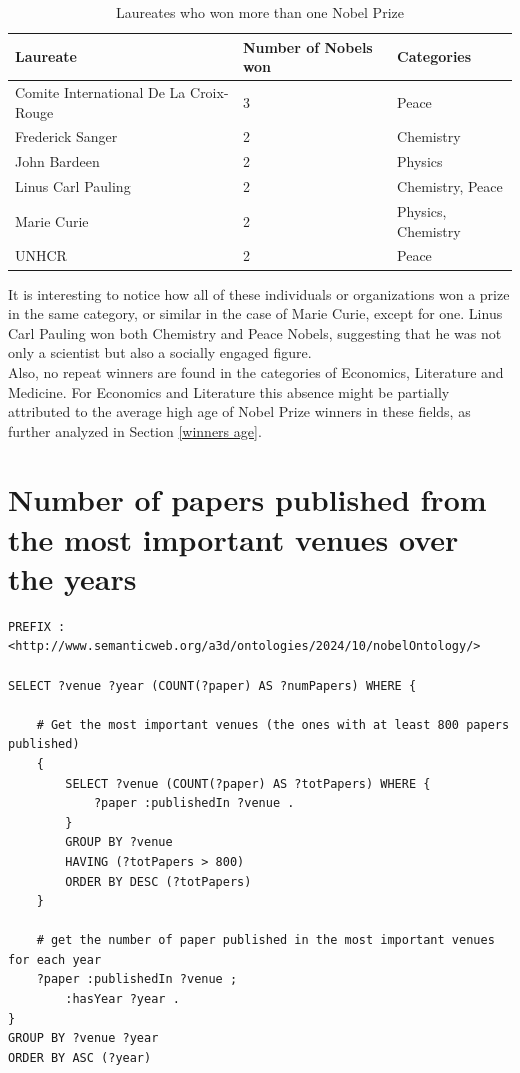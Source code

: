 \documentclass{article}
\begin{document}
\begin{table}[H]
	\caption{Laureates who won more than one Nobel Prize}
	\centering
	\begin{tabular}{|l|l|l|}
		\hline
		\textbf{Laureate}                      & \textbf{Number of Nobels won} & \textbf{Categories} \\ \hline
		Comite International De La Croix-Rouge & 3                             & Peace               \\ \hline
		Frederick Sanger                       & 2                             & Chemistry           \\ \hline
		John Bardeen                           & 2                             & Physics             \\ \hline
		Linus Carl Pauling                     & 2                             & Chemistry, Peace    \\ \hline
		Marie Curie                            & 2                             & Physics, Chemistry  \\ \hline
		UNHCR                                  & 2                             & Peace               \\ \hline
	\end{tabular}
	\label{tab:moreThanOneNobel}
\end{table}

It is interesting to notice how all of these individuals or organizations won a prize in the same category,
or similar in the case of Marie Curie, except for one. Linus Carl Pauling won both Chemistry and Peace Nobels,
suggesting that he was not only a scientist but also a socially engaged figure.\\
Also, no repeat winners are found in the categories of Economics, Literature and Medicine.
For Economics and Literature this absence might be partially attributed to the average high age of Nobel Prize
winners in these fields, as further analyzed in Section \ref{winners age}.\\

\section{Number of papers published from the most important venues over the years}

\begin{lstlisting}
PREFIX : <http://www.semanticweb.org/a3d/ontologies/2024/10/nobelOntology/>

SELECT ?venue ?year (COUNT(?paper) AS ?numPapers) WHERE {

    # Get the most important venues (the ones with at least 800 papers published)
    {
        SELECT ?venue (COUNT(?paper) AS ?totPapers) WHERE {
            ?paper :publishedIn ?venue .
        }
        GROUP BY ?venue
        HAVING (?totPapers > 800)
        ORDER BY DESC (?totPapers)
    }

    # get the number of paper published in the most important venues for each year
    ?paper :publishedIn ?venue ;
        :hasYear ?year .
}
GROUP BY ?venue ?year
ORDER BY ASC (?year)
\end{lstlisting}
\end{document}
